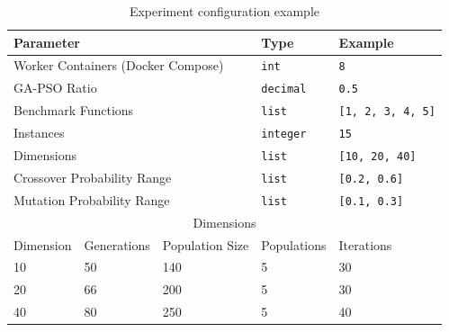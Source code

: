 \documentclass[review]{elsarticle}
\begin{document}
\begin{table}[h!tbp]
  \small
  \caption{ Experiment configuration example 
  }
  \label{tab:params}
  \centering
  \small
  \begin{tabular}{|l|l|l|l|l|}
    \hline
    \multicolumn{3}{|l|}{Parameter}                    & Type             & Example         \\ \hline
    \multicolumn{3}{|l|}{Worker Containers (Docker Compose)}        & \texttt{int}     & \texttt{8} \\ \hline
    \multicolumn{3}{|l|}{GA-PSO Ratio}                 & \texttt{decimal} & \texttt{0.5}    \\  \hline
    \multicolumn{3}{|l|}{Benchmark Functions}          & \texttt{list}    & \texttt{[1, 2, 3, 4, 5]} \\ \hline
    \multicolumn{3}{|l|}{Instances}                    & \texttt{integer}    & \texttt{15} \\ \hline
    \multicolumn{3}{|l|}{Dimensions}                   & \texttt{list}    & \texttt{[10, 20, 40]}        \\ \hline
    \multicolumn{3}{|l|}{Crossover Probability Range}  & \texttt{list}    & \texttt{[0.2, 0.6]}      \\ \hline
    \multicolumn{3}{|l|}{Mutation  Probability Range}  & \texttt{list}    & \texttt{[0.1, 0.3]}      \\ \hline
    \multicolumn{5}{|c|}{Dimensions}                                                      \\ \hline  
    Dimension               & Generations & Population Size & Populations  &     Iterations    \\ \hline
            10              & 50      & 140                 &      5                 & 30                \\ \hline
            20              & 66      & 200                 &      5                 & 30               \\ \hline
            40              & 80      & 250                 &      5                 & 40                \\ \hline
  \end{tabular}
\end{table}
\end{document}
